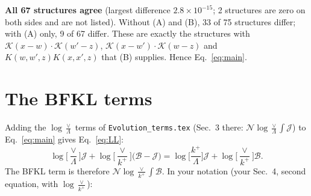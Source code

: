 \documentclass[10pt]{article}
\numberwithin{equation}{section}
\newcommand{\KK}{\mathcal K}
\newcommand{\NN}{\mathcal N}
\newcommand{\BB}{\mathcal B}
\newcommand{\JJ}{\mathcal J}
\begin{document}
\noindent\textbf{All 67 structures agree} (largest difference $2.8\times10^{-15}$; 2 structures are zero on both sides and are not listed). Without (A) and (B), 33 of 75 structures differ; with (A) only, 9 of 67 differ. These are exactly the structures with $\KK(x-w)\cdot\KK(w'-z)$, $\KK(x-w')\cdot\KK(w-z)$ and $K(w,w',z)K(x,x',z)$ that (B) supplies. Hence Eq.~\eqref{eq:main}.

\section{The BFKL terms}\label{sec:bfkl}
Adding the $\log\frac{\vee}{\Lambda}$ terms of \texttt{Evolution\_terms.tex} (Sec.~3 there: $\NN\log\frac{\vee}{\Lambda}\int\JJ$) to Eq.~\eqref{eq:main} gives Eq.~\eqref{eq:LL}:
\begin{equation*}
\log\Big[\frac{\vee}{\Lambda}\Big]\JJ+\log\Big[\frac{\vee}{k^+}\Big]\big(\BB-\JJ\big)=\log\Big[\frac{k^+}{\Lambda}\Big]\JJ+\log\Big[\frac{\vee}{k^+}\Big]\BB .
\end{equation*}
The BFKL term is therefore $\NN\log\frac{\vee}{k^+}\int\BB$. In your notation (your Sec.~4, second equation, with $\log\frac{\vee}{k^+}$):
\end{document}
